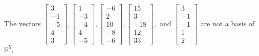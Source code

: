 \begin{exercise}
\begin{exerciseStatement}
  \end{exerciseStatement}
  \begin{exerciseAnswer}
   The vectors \(\left[\begin{array}{r}
3 \\
-1 \\
-5 \\
4 \\
3
\end{array}\right] , \left[\begin{array}{r}
1 \\
-3 \\
-4 \\
4 \\
-5
\end{array}\right] , \left[\begin{array}{r}
-6 \\
2 \\
10 \\
-8 \\
-6
\end{array}\right] , \left[\begin{array}{r}
15 \\
3 \\
-18 \\
12 \\
33
\end{array}\right] , \text{ and } \left[\begin{array}{r}
3 \\
-1 \\
-1 \\
1 \\
2
\end{array}\right]\) 
  	 are not  a basis of \(\mathbb{R}^5\).
  


  \end{exerciseAnswer}
\end{exercise}